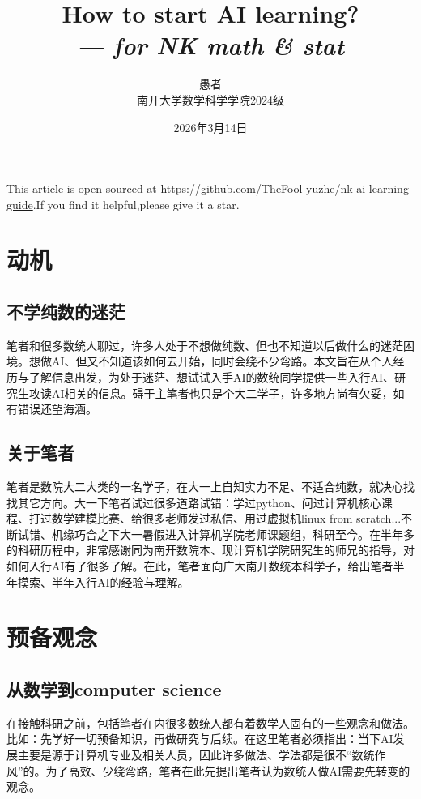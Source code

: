 \documentclass[12pt, a4paper, fontset=ubuntu]{ctexart}
\title{\textbf{\Huge How to start AI learning?} \\ \vspace{0.3em} \large \textit{--- for NK math \& stat}}
\author{愚者 \\ 南开大学数学科学学院2024级}
\date{2026年3月14日}
\begin{document}
\maketitle

\tableofcontents
\vfill
\noindent This article is open-sourced at \url{https://github.com/TheFool-yuzhe/nk-ai-learning-guide}.If you find it helpful,please give it a star.
\newpage


\section{动机}

\subsection{不学纯数的迷茫}
笔者和很多数统人聊过，许多人处于不想做纯数、但也不知道以后做什么的迷茫困境。想做AI、但又不知道该如何去开始，同时会绕不少弯路。本文旨在从个人经历与了解信息出发，为处于迷茫、想试试入手AI的数统同学提供一些入行AI、研究生攻读AI相关的信息。碍于主笔者也只是个大二学子，许多地方尚有欠妥，如有错误还望海涵。
\subsection{关于笔者}
笔者是数院大二大类的一名学子，在大一上自知实力不足、不适合纯数，就决心找找其它方向。大一下笔者试过很多道路试错：学过python、问过计算机核心课程、打过数学建模比赛、给很多老师发过私信、用过虚拟机linux from scratch...不断试错、机缘巧合之下大一暑假进入计算机学院老师课题组，科研至今。在半年多的科研历程中，非常感谢同为南开数院本、现计算机学院研究生的师兄的指导，对如何入行AI有了很多了解。在此，笔者面向广大南开数统本科学子，给出笔者半年摸索、半年入行AI的经验与理解。

\section{预备观念}

\subsection{从数学到computer science}
在接触科研之前，包括笔者在内很多数统人都有着数学人固有的一些观念和做法。比如：先学好一切预备知识，再做研究与后续。在这里笔者必须指出：当下AI发展主要是源于计算机专业及相关人员，因此许多做法、学法都是很不“数统作风”的。为了高效、少绕弯路，笔者在此先提出笔者认为数统人做AI需要先转变的观念。
\end{document}
